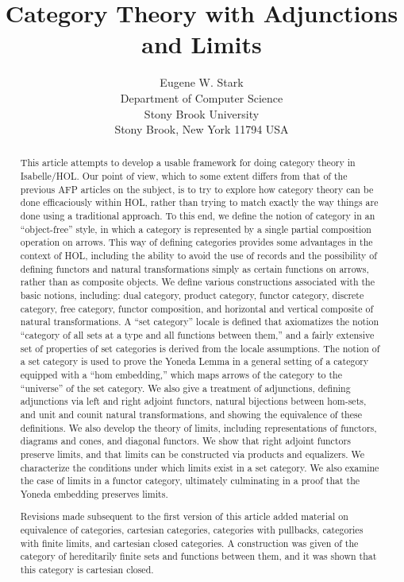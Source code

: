 \documentclass[11pt,notitlepage,a4paper]{report}
\begin{document}
\title{Category Theory with Adjunctions and Limits}
\author{Eugene W. Stark\\[\medskipamount]
        Department of Computer Science\\
        Stony Brook University\\
        Stony Brook, New York 11794 USA}
\maketitle

\begin{abstract}
This article attempts to develop a usable framework for doing category theory in Isabelle/HOL.
Our point of view, which to some extent differs from that of the previous AFP articles
on the subject, is to try to explore how category theory can be done efficaciously within
HOL, rather than trying to match exactly the way things are done using a traditional
approach.  To this end, we define the notion of category in an ``object-free''
style, in which a category is represented by a single partial composition operation on arrows.
This way of defining categories provides some advantages in the context of HOL, including
the ability to avoid the use of records and the possibility of defining functors and
natural transformations simply as certain functions on arrows, rather than as composite
objects.  We define various constructions associated with the basic notions,
including: dual category, product category, functor category, discrete category, free category,
functor composition, and horizontal and vertical composite of natural transformations.
A ``set category'' locale is defined that axiomatizes the notion ``category of all sets at
a type and all functions between them,'' and a fairly extensive set of properties of set
categories is derived from the locale assumptions.
The notion of a set category is used to prove the Yoneda Lemma in a general setting
of a category equipped with a ``hom embedding,'' which maps arrows of the category
to the ``universe'' of the set category.
We also give a treatment of adjunctions, defining adjunctions via left and right adjoint
functors, natural bijections between hom-sets, and unit and counit natural transformations,
and showing the equivalence of these definitions.
We also develop the theory of limits, including representations of functors,
diagrams and cones, and diagonal functors.  We show that right adjoint functors preserve
limits, and that limits can be constructed via products and equalizers.  We characterize
the conditions under which limits exist in a set category.  We also examine the case of
limits in a functor category, ultimately culminating in a proof that the Yoneda embedding
preserves limits.

Revisions made subsequent to the first version of this article added material on equivalence
of categories, cartesian categories, categories with pullbacks, categories with finite limits,
and cartesian closed categories.  A construction was given of the category of hereditarily
finite sets and functions between them, and it was shown that this category is cartesian closed.
\end{abstract}
\end{document}
